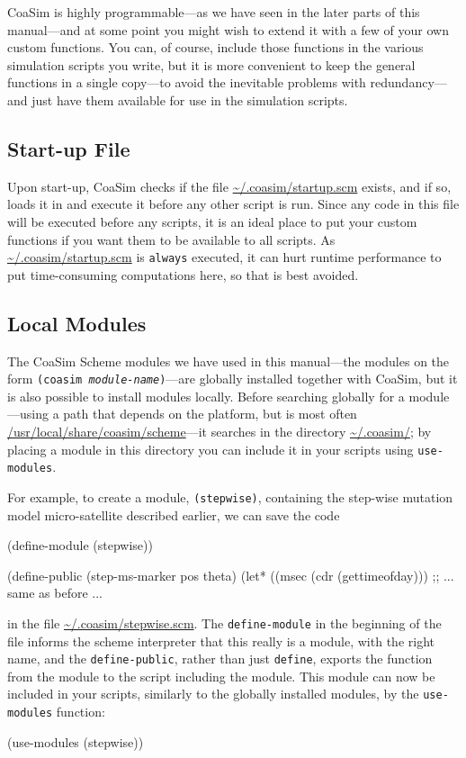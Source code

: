 \documentclass{manual}
\begin{document}
\begin{empfile}
CoaSim is highly programmable---as we have seen in the later parts of
this manual---and at some point you might wish to extend it with a few
of your own custom functions.  You can, of course, include those
functions in the various simulation scripts you write, but it is more
convenient to keep the general functions in a single copy---to avoid
the inevitable problems with redundancy---and just have them available
for use in the simulation scripts.


\subsection{Start-up File}
\label{sec:start-up-file}

Upon start-up, CoaSim checks if the file \url{~/.coasim/startup.scm}
exists, and if so, loads it in and execute it before any other script
is run.  Since any code in this file will be executed before any
scripts, it is an ideal place to put your custom functions if you want
them to be available to all scripts.  As \url{~/.coasim/startup.scm}
is \texttt{always} executed, it can hurt runtime performance to put
time-consuming computations here, so that is best avoided.


\subsection{Local Modules}
\label{sec:local-modules}

The CoaSim Scheme modules we have used in this manual---the modules on
the form \texttt{(coasim \emph{module-name})}---are globally installed
together with CoaSim, but it is also possible to install modules
locally.  Before searching globally for a module---using a path that
depends on the platform, but is most often
\url{/usr/local/share/coasim/scheme}---it searches in the directory
\url{~/.coasim/}; by placing a module in this directory you can
include it in your scripts using \texttt{use-modules}.

For example, to create a module, \texttt{(stepwise)}, containing the
step-wise mutation model micro-satellite described earlier, we can
save the code
\begin{code}
(define-module (stepwise))

(define-public (step-ms-marker pos theta)
  (let* ((msec (cdr (gettimeofday)))
  ;; ... same as before ...
\end{code}
in the file \url{~/.coasim/stepwise.scm}.  The \texttt{define-module}
in the beginning of the file informs the scheme interpreter that this
really is a module, with the right name, and the
\texttt{define-public}, rather than just \texttt{define}, exports the
function from the module to the script including the module.  This
module can now be included in your scripts, similarly to the globally
installed modules, by the \texttt{use-modules} function:
\begin{code}
(use-modules (stepwise))
\end{code}


\end{empfile}
\end{document}
